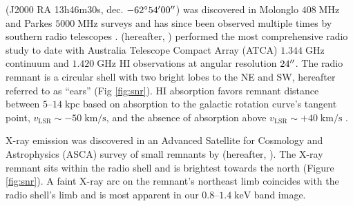 \documentclass[preprint2,tighten,trackchanges]{aastex6}
\newcommand*{\mt}{\mathrm}
\newcommand*{\unit}[1]{\;\mt{#1}}  %
\begin{document}
 (J2000 RA 13h46m30s, dec. $-62\mbox{$^\circ$} 54\mbox{$^\prime$} 00\mbox{$^{\prime\prime}$}$) was
discovered in Molonglo $408 \unit{MHz}$ and Parkes $5000 \unit{MHz}$ surveys
\citep{day1969, clark1973, green1974, clark1975} and has since been observed
multiple times by southern radio telescopes \citep{caswell1981, kesteven1987,
whiteoak1996}.
\citet{gaensler1998-g309} (hereafter, ) performed the most
comprehensive radio study to date with Australia Telescope Compact Array (ATCA)
$1.344 \unit{GHz}$ continuum and $1.420 \unit{GHz}$ HI observations at angular
resolution $24\mbox{$^{\prime\prime}$}$.
The radio remnant is a circular shell with two bright lobes to the NE and SW,
hereafter referred to as ``ears'' (Fig \ref{fig:snr}).
HI absorption favors remnant distance between $5$--$14 \unit{kpc}$ based on
absorption to the galactic rotation curve's tangent point,
$v_{\mt{LSR}} \sim -50 \unit{km/s}$, and the absence of absorption above
$v_{\mt{LSR}} \sim +40 \unit{km/s}$ .


X-ray emission was discovered in an Advanced Satellite for Cosmology and
Astrophysics (ASCA) survey of small remnants by \citet{rakowski2001}
(hereafter, ).
The X-ray remnant sits within the radio shell and is brightest towards the
north (Figure \ref{fig:snr}).
A faint X-ray arc on the remnant's northeast limb coincides with the radio
shell's limb and is most apparent in our $0.8$--$1.4 \unit{keV}$ band image.
\end{document}
